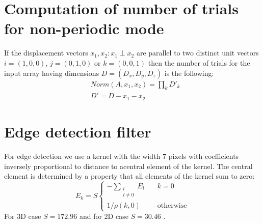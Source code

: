 \documentclass[reprint,amsmath,amssymb,aps,pre,showkeys,showpacs]{revtex4-1}
\begin{document}
\section{Computation of number of trials for non-periodic mode}
\label{sec:number-of-trials}
If the displacement vectors $x_1, x_2: x_1 \perp x_2$ are parallel to two
distinct unit vectors $i=(1,0,0)$, $j=(0,1,0)$ or $k=(0,0,1)$ then the number of
trials for the input array having dimensions $D = (D_x, D_y, D_z)$ is the
following:
\begin{equation}
  \begin{aligned}
    & Norm(A, x_1, x_2) = \prod_k D'_k \\
    & D' = D - x_1 - x_2
  \end{aligned}
\end{equation}

\section{Edge detection filter}
\label{sec:filter}
For edge detection we use a kernel with the width 7 pixels with coefficients
inversely proportional to distance to acentral element of the kernel. The
central element is determined by a property that all elements of the kernel sum
to zero:
\begin{equation}
  E_k = S \left\{
  \begin{array}{ll}
    -\sum\limits_{\substack{l \\ l \ne 0}} E_l & \quad k = 0 \\
    1 / \rho(k, 0) & \quad \text{otherwise}
  \end{array}
  \right.
\end{equation}
For 3D case $S=172.96$ and for 2D case $S=30.46$ \cite{postnicov20232}.


\end{document}
